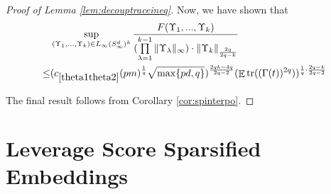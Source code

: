 \documentclass[11pt]{amsart}
\numberwithin{equation}{section}
\numberwithin{equation}{section}
\DeclareMathOperator{\E}{\mathbb{E}}
\DeclareMathOperator*{\tr}{tr}
\DeclarePairedDelimiter{\norm}{\lVert}{\rVert}
\theoremstyle{remark}
\theoremstyle{definition}
\begin{document}
\begin{proof}[Proof of Lemma \ref{lem:decouptraceineq}]
Now, we have shown that
\begin{align*}
    &\sup \limits_{(\Upsilon_1,...,\Upsilon_k) \in L_{\infty}(S_{\infty}^d)^k}\frac{F(\Upsilon_1,...,\Upsilon_k)}{(\prod\limits_{\lambda  = 1}^{k-1} {\norm{\Upsilon_\lambda }_{\infty}}) \cdot \norm{\Upsilon_k}_{\frac{2q}{2q-k}}} \\\le& (c_{\ref*{theta1theta2}}(pm)^{\frac{1}{q}}\sqrt{\max \{ pd, q \}})^{\frac{2qk-4q}{2q-2}} (\E \tr((\Gamma(t))^{2q}))^{\frac{1}{q} \cdot \frac{2q-k}{2q-2}} 
\end{align*}

The final result follows from Corollary \ref{cor:spinterpo}.


\end{proof}









 \section{Leverage Score Sparsified Embeddings} \label{sec:lessproofs}
\end{document}
